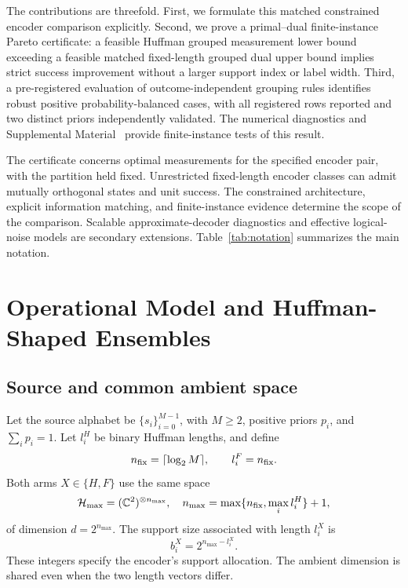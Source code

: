 \documentclass[reprint,amsmath,amssymb,aps,pra,floatfix]{revtex4-2}
\begin{document}
The contributions are threefold. First, we formulate this matched constrained encoder comparison explicitly. Second, we prove a primal--dual finite-instance Pareto certificate: a feasible Huffman grouped measurement lower bound exceeding a feasible matched fixed-length grouped dual upper bound implies strict success improvement without a larger support index or label width. Third, a pre-registered evaluation of outcome-independent grouping rules identifies robust positive probability-balanced cases, with all registered rows reported and two distinct priors independently validated. The numerical diagnostics and Supplemental Material~\cite{supplemental_material} provide finite-instance tests of this result.

The certificate concerns optimal measurements for the specified encoder pair, with the partition held fixed. Unrestricted fixed-length encoder classes can admit mutually orthogonal states and unit success. The constrained architecture, explicit information matching, and finite-instance evidence determine the scope of the comparison. Scalable approximate-decoder diagnostics and effective logical-noise models are secondary extensions. Table~\ref{tab:notation} summarizes the main notation.

\section{Operational Model and Huffman-Shaped Ensembles}
\label{sec:model}
\subsection{Source and common ambient space}
Let the source alphabet be $\{s_i\}_{i=0}^{M-1}$, with $M\ge2$, positive priors $p_i$, and $\sum_i p_i=1$. Let $l_i^H$ be binary Huffman lengths, and define
\begin{equation}
 n_{\rm fix}=\lceil\log_2 M\rceil,\qquad l_i^F=n_{\rm fix}.
 \label{eq:lengths}
\end{equation}
Both arms $X\in\{H,F\}$ use the same space
\begin{equation}
 \mathcal H_{\max}=(\mathbb C^2)^{\otimes n_{\max}},\quad
 n_{\max}=\max\{n_{\rm fix},\max_i l_i^H\}+1,
 \label{eq:ambient}
\end{equation}
of dimension $d=2^{n_{\max}}$. The support size associated with length $l_i^X$ is
\begin{equation}
 b_i^X=2^{n_{\max}-l_i^X}.
 \label{eq:support-size}
\end{equation}
These integers specify the encoder's support allocation. The ambient dimension is shared even when the two length vectors differ.
\end{document}
